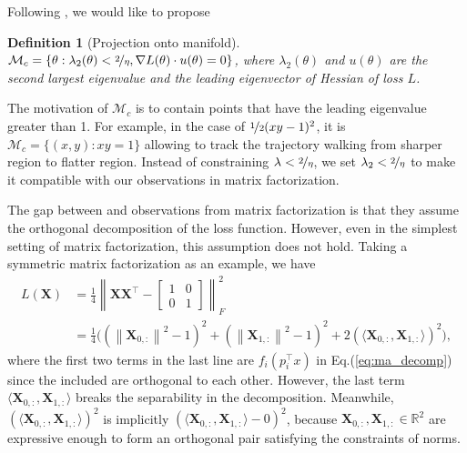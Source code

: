 \documentclass{article}
\newcommand{\citet}[1]{\cite{#1}}
\theoremstyle{plain}
\newtheorem{defi}{Definition}
\theoremstyle{remark}
\newcommand{\norm}[1]{\left\lVert#1\right\rVert}
\def\R{\mathbb{R}}
\def\bX{\mathbf{X}}
\begin{document}
Following \citet{damian2022self}, we would like to propose

\begin{defi}[Projection onto manifold]
    $\mathcal{M}_c=\{\theta:\lambda_2(\theta)<\nicefrac{2}{\eta}, \nabla L(\theta)\cdot u(\theta)=0\}$, where $\lambda_2(\theta)$ and $u(\theta)$ are the second largest eigenvalue and the leading eigenvector of Hessian of loss $L$.
\end{defi}
The motivation of $\mathcal{M}_c$ is to contain points that have the leading eigenvalue greater than 1. For example, in the case of $\nicefrac{1}{2}(xy-1)^2$, it is $\mathcal{M}_c=\{(x,y):xy=1\}$ allowing to track the trajectory walking from sharper region to flatter region. Instead of constraining $\lambda<\nicefrac{2}{\eta}$, we set $\lambda_2<\nicefrac{2}{\eta}$ to make it compatible with our observations in matrix factorization.

The gap between \citet{ma2022multiscale} and observations from matrix factorization is that they assume the orthogonal decomposition of the loss function. However, even in the simplest setting of matrix factorization, this assumption does not hold.
Taking a symmetric matrix factorization as an example, we have
\begin{align}
        L(\bX) &=
        \frac{1}{4}
        \norm{
            \bX\bX^\top
            -
            \begin{bmatrix}
                1 & 0 \\
                0 & 1
            \end{bmatrix}
        }_F^2
        \nonumber
        \\
        &=
        \frac{1}{4}
        \bigg(
            \left(\norm{\bX_{0,:}}^2-1\right)^2
            +
            \left(\norm{\bX_{1,:}}^2-1\right)^2
            + 
            2\left(\langle\bX_{0,:}, \bX_{1,:}\rangle\right)^2
        \bigg),
\end{align}
where the first two terms in the last line are $f_i(p_i^\top x)$ in Eq.(\ref{eq:ma_decomp}) since the included are orthogonal to each other. However, the last term $\langle\bX_{0,:}, \bX_{1,:}\rangle$ breaks the separability in the decomposition. Meanwhile, $\left(\langle\bX_{0,:}, \bX_{1,:}\rangle\right)^2$ is implicitly $\left(\langle\bX_{0,:}, \bX_{1,:}\rangle - 0\right)^2$, because $\bX_{0,:}, \bX_{1,:}\in\R^2$ are expressive enough to form an orthogonal pair satisfying the constraints of norms.
\end{document}
